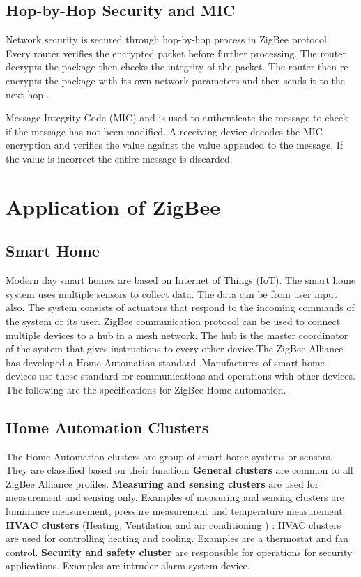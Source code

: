 \documentclass[conference]{IEEEtran}
\begin{document}
\subsection{ Hop-by-Hop Security and MIC}
Network security is secured through hop-by-hop process in ZigBee protocol. Every router verifies the encrypted packet before further processing. The router decrypts the package then checks the integrity of the packet. The router then re-encrypts the package with its own network parameters and then sends it to the next hop \cite{Security_AN1233} .

Message Integrity Code (MIC) and is used to authenticate the message to check if the message has not been modified. A receiving device decodes the MIC encryption and  verifies the value against the value appended to the message. If the value is incorrect the entire message is discarded.\cite{Security_AN1233}

\section{Application of ZigBee}

\subsection{Smart Home}
Modern day smart homes are based on Internet of Things (IoT). The smart home system uses multiple sensors to collect data. The data can be from user input also. The system consists of actuators that respond to the incoming commands of the system or its user.
ZigBee communication protocol can be used to connect multiple devices to a hub in a mesh network. The hub is the master coordinator of the system that gives instructions to every other device.The ZigBee Alliance has developed a Home Automation standard \cite{Elahi}.Manufactures of smart home devices use these standard for communications and operations with other devices. The following are the specifications for ZigBee Home automation.
 
\subsection{Home Automation Clusters}
The Home Automation clusters are group of smart home systems or sensors. They are classified based on their function:
\textbf{General clusters} are common to all ZigBee Alliance profiles. \textbf{Measuring and sensing clusters} are used for measurement and sensing only. Examples of measuring and sensing clusters are luminance measurement, pressure measurement and temperature measurement.
\textbf{HVAC clusters }(Heating, Ventilation and air conditioning ) : HVAC clusters are used for controlling heating and cooling. Examples are  a thermostat and fan control. \textbf{Security and safety cluster} are responsible for operations for security applications. Examples are intruder alarm system device.
\end{document}
